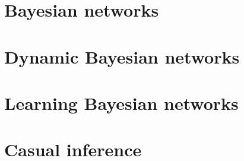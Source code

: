 \documentclass[12pt, a4paper]{report}
\begin{document}
    \chapter{Bayesian networks}
    
    
    
    
    
    
    
    
    \chapter{Dynamic Bayesian networks}
    
    
    
    
    \chapter{Learning Bayesian networks}
    

    \chapter{Casual inference}
    
\end{document}
